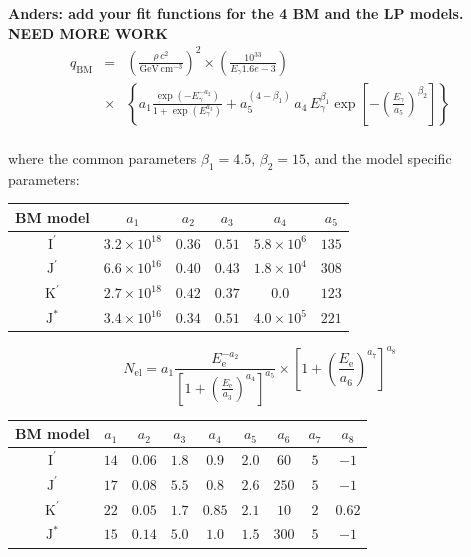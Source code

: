 \documentclass[10pt,aps,pra,reprint,amsmath,amsfonts,amssymb,showpacs,nofootinbib,floatfix]{revtex4-1}
\def\del#1{{}}
\newcommand{\rmn}{\mathrm}
\newcommand{\ee}{E_\rmn{e}}
\newcommand{\Kp}{\rmn{K}^\prime}
\newcommand{\Ip}{\rmn{I}^\prime}
\newcommand{\Js}{\rmn{J}^*}
\newcommand{\Jp}{\rmn{J}^\prime}
\newcommand{\cm}{\rmn{cm}}
\newcommand{\gev}{\rmn{GeV}}
\newcommand{\eg}{E_\gamma}
\begin{document}
{\bf Anders: add your fit functions for the 4 BM and the LP models. NEED MORE WORK}
\begin{eqnarray}
q_\rmn{BM}&=&\left(\frac{\rho\,c^2}{\gev\,\cm^{-3}}\right)^2\times
\left(\frac{10^{33}}{\eg1.6e-3}\right) \nonumber\\
&\times&\left\{a_1\frac{\exp\left(-\eg^{-a_2}\right)}{1+\exp\left(\eg^{a_3}\right)}+a_5^{\left(4-\beta_1\right)}\,a_4\,\eg^{\beta_1}
\exp\left[-\left(\frac{\eg}{a_5}\right)^{\beta_2}\right]\right\} \nonumber\\
 \label{eq:bm_cont}
\end{eqnarray}

\del{      egn = eg/GeV
diffBM=(p1*dexp(-egn**(-p2))/(1.+dexp(egn**p3))+
     1     p5**(4.-pow1)*p4*egn**pow1*dexp(-(egn/p5)**pow2))
     2     /(egn)/GeV}

where the common parameters $\beta_1 = 4.5,\,\beta_2 = 15$, and the
model specific parameters:
\begin{table}
\begin{tabular}{c c c c c c }
\hline
\hline
 BM model & $a_1$ & $a_2$  & $a_3$ & $a_4$  & $a_5$ \\
 \hline
$\Ip$ & $3.2\times10^{18}$ & $0.36$ & $0.51$ & $5.8\times10^6$ & $135$ \\
$\Jp$ & $6.6\times10^{16}$ & $0.40$ & $0.43$ & $1.8\times10^4$ & $308$ \\
$\Kp$ & $2.7\times10^{18}$ & $0.42$ & $0.37$ & $0.0$           & $123$ \\
$\Js$ & $3.4\times10^{16}$ & $0.34$ & $0.51$ & $4.0\times10^5$ & $221$ \\
\hline
\hline
\end{tabular}
\begin{quote}
 \label{tab:bm_cont}
  \end{quote}
\end{table} 

\begin{equation}
N_\rmn{el} = a_1\frac{\ee^{-a_2}}
{\left[1+\left(\frac{\ee}{a_3}\right)^{a_4}\right]^{a_5}}
\times\left[1+\left(\frac{\ee}{a_6}\right)^{a_7}\right]^{a_8}
\label{eq:bm_elec}
\end{equation}

\begin{table}
\begin{tabular}{c c c c c c c c c}
\hline
\hline
 BM model & $a_1$ & $a_2$ & $a_3$ & $a_4$ & $a_5$ & $a_6$ & $a_7$ & $a_8$ \\
 \hline
$\Ip$ & $14$ & $0.06$ & $1.8$ & $0.9$  & $2.0$ & $60$  & $5$ & $-1$     \\
$\Jp$ & $17$ & $0.08$ & $5.5$ & $0.8$  & $2.6$ & $250$ & $5$ & $-1$     \\
$\Kp$ & $22$ & $0.05$ & $1.7$ & $0.85$ & $2.1$ & $10$  & $2$ & $0.62$ \\
$\Js$ & $15$ & $0.14$ & $5.0$ & $1.0$  & $1.5$ & $300$ & $5$ & $-1$     \\
\hline
\hline
\end{tabular}
\begin{quote}
 \label{tab:bm_elec}
  \end{quote}
\end{table} 
\end{document}
